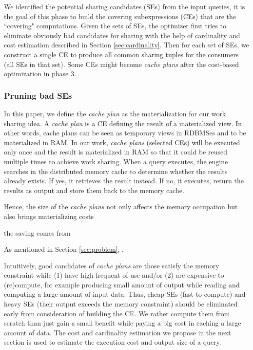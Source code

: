 We identified the potential sharing candidates (SEs) from the input queries, it is the goal of this phase to build the covering subexpressions (CEs) that are the ``covering" computations. Given the sets of SEs, the optimizer first tries to eliminate obviously bad candidates for sharing with the help of cardinality and cost estimation described in Section \ref{sec:cardinality}. Then for each set of SEs, we construct a single CE to produce all common sharing tuples for the consumers (all SEs in that set). Some CEs might become \emph{cache plans} after the cost-based optimization in phase 3. 

\subsubsection{Pruning bad SEs}
\label{sec:se-prune}
In this paper, we define the \emph{cache plan} as the materialization for our work sharing idea. A \emph{cache plan} is a CE defining the result of a materialized view. In other words, cache plans can be seen as temporary views in RDBMSes and to be materialized in RAM. In our work, \emph{cache plans} (selected CEs) will be executed only once and the result is materialized in RAM so that it could be reused multiple times to achieve work sharing. When a query executes, the engine searches in the distributed memory cache to determine whether the results already exists. If yes, it retrieves the result instead. If no, it executes, return the results as output and store them back to the memory cache.

Hence, the size of the \emph{cache plans} not only affects the memory occupation but also brings materializing costs

the saving comes from 

As mentioned in Section \ref{sec:problem}, . 


Intuitively, good candidates of \emph{cache plans} are those satisfy the memory constraint while (1) have high frequent of use and/or (2) are expensive to (re)compute, for example producing small amount of output while reading and computing a large amount of input data. Thus, cheap SEs (fast to compute) and heavy SEs (their output exceeds the memory constraint) should be eliminated early from consideration of building the CE. We rather compute them from scratch than just gain a small benefit while paying a big cost in caching a large amount of data. The cost and cardinality estimation we propose in the next section is used to estimate the execution cost and output size of a query.




